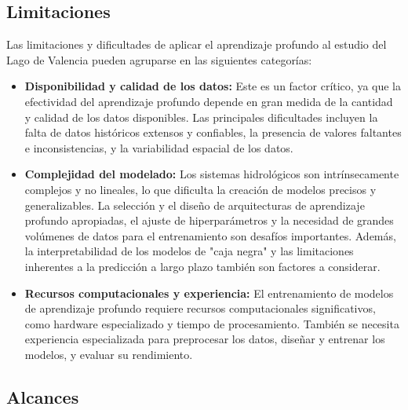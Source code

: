 \documentclass[12pt]{article}
\begin{document}
\subsection{Limitaciones}
Las limitaciones y dificultades de aplicar el aprendizaje profundo al estudio del Lago de Valencia pueden agruparse en las siguientes categorías:
\begin{itemize}
    \item \textbf{Disponibilidad y calidad de los datos:} Este es un factor crítico, ya que la efectividad del aprendizaje profundo depende en gran medida de la cantidad y calidad de los datos disponibles. Las principales dificultades incluyen la falta de datos históricos extensos y confiables, la presencia de valores faltantes e inconsistencias, y la variabilidad espacial de los datos.
    \item \textbf{Complejidad del modelado:} Los sistemas hidrológicos son intrínsecamente complejos y no lineales, lo que dificulta la creación de modelos precisos y generalizables. La selección y el diseño de arquitecturas de aprendizaje profundo apropiadas, el ajuste de hiperparámetros y la necesidad de grandes volúmenes de datos para el entrenamiento son desafíos importantes. Además, la interpretabilidad de los modelos de "caja negra" y las limitaciones inherentes a la predicción a largo plazo también son factores a considerar.
    \item \textbf{Recursos computacionales y experiencia:} El entrenamiento de modelos de aprendizaje profundo requiere recursos computacionales significativos, como hardware especializado y tiempo de procesamiento. También se necesita experiencia especializada para preprocesar los datos, diseñar y entrenar los modelos, y evaluar su rendimiento.
\end{itemize}

\subsection{Alcances}
\end{document}
